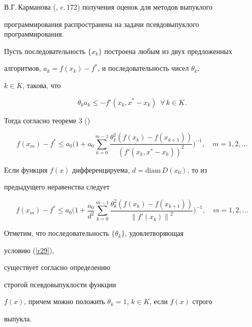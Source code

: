 В.Г.\,Карманова (\cite{b6}, c.\,172) получения оценок для методов выпуклого


программирования распространена на задачи псевдовыпуклого программирования.


Пусть последовательность $\{x_k\}$ построена любым из двух предложенных


алгоритмов, $a_k=f(x_k)-f^*$, и последовательность чисел $\theta_k$,


$k\in K$, такова, что




\begin{equation} \label{r29}


\theta_k a_k \le -f'(x_k, x^*-x_k) \ \; \forall \, k\in K.


\end{equation}


%


Тогда согласно теореме 3 (\cite{b5})


%


$$


f(x_m)-f^*\le a_0 \bigg (1+ a_0


\sum_{k=0}^{m-1}


{\frac{\theta_k^2(f(x_k)-f(x_{k+1}))}{{(f'(x_k,x^*-x_k))}^2}}


\bigg )^{-1},\quad m=1,2,\dotsc


$$


Если функция $f(x)$ дифференцируема, $d=\mathrm{diam}\, D(x_0)$, то из


предыдущего неравенства следует 


%


$$


f(x_m)-f^*\le a_0 \bigg (1+ {\frac{a_0}{d^2}}


\sum_{k=0}^{m-1} \frac{\theta_k^2(f(x_k)-f(x_{k+1}))}{{\|f'(x_k)\|}^2}


\bigg )^{-1},\quad m=1,2,\dotsc


$$


Отметим, что последовательность $\{\theta_k\}$, удовлетворяющая


условию (\ref{r29}),


существует согласно определению


строгой псевдовыпуклости функции


$f(x)$, причем можно положить $\theta_k=1$, $k\in K$, если $f(x)$ строго


выпукла.








